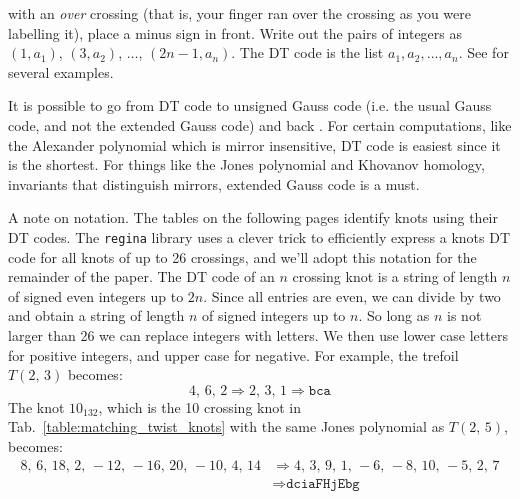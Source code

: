 \documentclass{article}
\theoremstyle{plain}
\begin{document}
        with an \textit{over} crossing (that is, your finger ran over the
        crossing as you were labelling it), place a minus sign in front. Write
        out the pairs of integers as $(1,a_{1})$, $(3,a_{2})$, $\dots$,
        $(2n-1,a_{n})$. The DT code is the list $a_{1},a_{2},\dots,a_{n}$.
        See \cite{KatlasDTCode} for several examples.
        \par\hfill\par
        It is possible to go from DT code to unsigned
        Gauss code (i.e. the usual Gauss code, and not the extended Gauss code)
        and back \cite{KatlasDTCode}. For certain computations,
        like the Alexander polynomial which
        is mirror insensitive, DT code is easiest since it is the shortest.
        For things like the Jones polynomial and Khovanov homology, invariants
        that distinguish mirrors, extended Gauss code is a must.
        \par\hfill\par
        A note on notation. The tables on the following pages identify knots using their DT
        codes. The \texttt{regina} library \cite{regina} uses a clever trick to efficiently
        express a knots DT code for all knots of up to 26 crossings, and we'll
        adopt this notation for the remainder of the paper. The DT code of an
        $n$ crossing knot is a string of length $n$ of signed even integers up
        to $2n$. Since all entries are even, we can divide by two and obtain
        a string of length $n$ of signed integers up to $n$. So long as $n$ is
        not larger than 26 we can replace integers with letters. We then use
        lower case letters for positive integers, and upper case for negative.
        For example, the trefoil $T(2,\,3)$ becomes:
        \begin{equation}
            4,\,6,\,2
            \Rightarrow
            2,\,3,\,1
            \Rightarrow
            \texttt{bca}
        \end{equation}
        The knot $10_{132}$, which is the 10 crossing knot in
        Tab.~\ref{table:matching_twist_knots} with the same Jones polynomial
        as $T(2,\,5)$, becomes:
        \begin{align}
            8,\,6,\,18,\,2,\,-12,\,-16,\,20,\,-10,\,4,\,14
            &\Rightarrow
            4,\,3,\,9,\,1,\,-6,\,-8,\,10,\,-5,\,2,\,7\\
            &\Rightarrow
            \texttt{dciaFHjEbg}
        \end{align}
\end{document}
